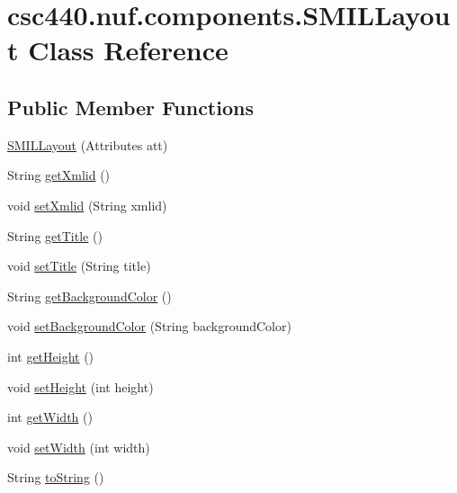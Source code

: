 \hypertarget{classcsc440_1_1nuf_1_1components_1_1_s_m_i_l_layout}{\section{csc440.\-nuf.\-components.\-S\-M\-I\-L\-Layout Class Reference}
\label{classcsc440_1_1nuf_1_1components_1_1_s_m_i_l_layout}
}
\subsection*{Public Member Functions}
\begin{DoxyCompactItemize}
\item 
\hyperlink{classcsc440_1_1nuf_1_1components_1_1_s_m_i_l_layout_a9a121e49635c5e847b46dd4031afede9}{S\-M\-I\-L\-Layout} (Attributes att)
\item 
String \hyperlink{classcsc440_1_1nuf_1_1components_1_1_s_m_i_l_layout_a08fee20d86b3197f8db7c14257a305f8}{get\-Xmlid} ()
\item 
void \hyperlink{classcsc440_1_1nuf_1_1components_1_1_s_m_i_l_layout_a436951da124cbb8849d1d78313195245}{set\-Xmlid} (String xmlid)
\item 
String \hyperlink{classcsc440_1_1nuf_1_1components_1_1_s_m_i_l_layout_a4bb394e41713de8e63eed56b513e9895}{get\-Title} ()
\item 
void \hyperlink{classcsc440_1_1nuf_1_1components_1_1_s_m_i_l_layout_aeab630ad66b54dadde37617d40236242}{set\-Title} (String title)
\item 
String \hyperlink{classcsc440_1_1nuf_1_1components_1_1_s_m_i_l_layout_a439b9b251d41c9e3784b1da182f89ee8}{get\-Background\-Color} ()
\item 
void \hyperlink{classcsc440_1_1nuf_1_1components_1_1_s_m_i_l_layout_a068bcdcd53482b8bf0523aff2f9265e7}{set\-Background\-Color} (String background\-Color)
\item 
int \hyperlink{classcsc440_1_1nuf_1_1components_1_1_s_m_i_l_layout_a6c3c8f3a23cdf0c1fc04f5661ed0edd2}{get\-Height} ()
\item 
void \hyperlink{classcsc440_1_1nuf_1_1components_1_1_s_m_i_l_layout_a83e96efea6adf1f1e3d46c781598deb9}{set\-Height} (int height)
\item 
int \hyperlink{classcsc440_1_1nuf_1_1components_1_1_s_m_i_l_layout_ab94c0389b854476f03e1b49f83fa83ec}{get\-Width} ()
\item 
void \hyperlink{classcsc440_1_1nuf_1_1components_1_1_s_m_i_l_layout_a2c03ffc172e1fc4d8d1a24cdd7163273}{set\-Width} (int width)
\item 
String \hyperlink{classcsc440_1_1nuf_1_1components_1_1_s_m_i_l_layout_a6e3f40fdd577d4cb4c8a309935126826}{to\-String} ()
\end{DoxyCompactItemize}
